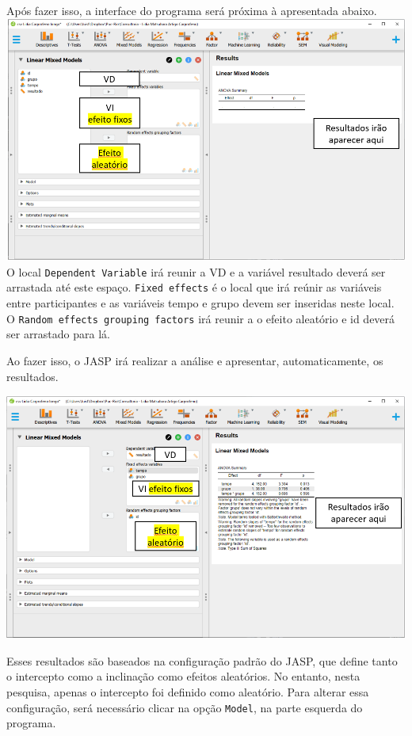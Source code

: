 \documentclass[
]{book}
\begin{document}
Após fazer isso, a interface do programa será próxima à apresentada
abaixo. \includegraphics{./img/cap_lmm_interface2.png} O local
\texttt{Dependent\ Variable} irá reunir a VD e a variável resultado
deverá ser arrastada até este espaço. \texttt{Fixed\ effects} é o local
que irá reúnir as variáveis entre participantes e as variáveis tempo e
grupo devem ser inseridas neste local. O
\texttt{Random\ effects\ grouping\ factors} irá reunir a o efeito
aleatório e id deverá ser arrastado para lá.

Ao fazer isso, o JASP irá realizar a análise e apresentar,
automaticamente, os resultados.

\includegraphics{./img/cap_lmm_interface3.png}

Esses resultados são baseados na configuração padrão do JASP, que define
tanto o intercepto como a inclinação como efeitos aleatórios. No
entanto, nesta pesquisa, apenas o intercepto foi definido como
aleatório. Para alterar essa configuração, será necessário clicar na
opção \texttt{Model}, na parte esquerda do programa.
\end{document}
